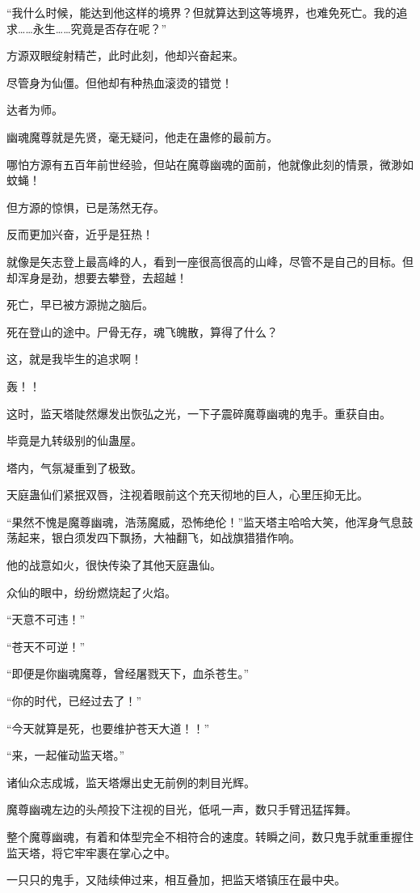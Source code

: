 \begin{this_body}
“我什么时候，能达到他这样的境界？但就算达到这等境界，也难免死亡。我的追求……永生……究竟是否存在呢？”

方源双眼绽射精芒，此时此刻，他却兴奋起来。

尽管身为仙僵。但他却有种热血滚烫的错觉！

达者为师。

幽魂魔尊就是先贤，毫无疑问，他走在蛊修的最前方。

哪怕方源有五百年前世经验，但站在魔尊幽魂的面前，他就像此刻的情景，微渺如蚊蝇！

但方源的惊惧，已是荡然无存。

反而更加兴奋，近乎是狂热！

就像是矢志登上最高峰的人，看到一座很高很高的山峰，尽管不是自己的目标。但却浑身是劲，想要去攀登，去超越！

死亡，早已被方源抛之脑后。

死在登山的途中。尸骨无存，魂飞魄散，算得了什么？

这，就是我毕生的追求啊！

轰！！

这时，监天塔陡然爆发出恢弘之光，一下子震碎魔尊幽魂的鬼手。重获自由。

毕竟是九转级别的仙蛊屋。

塔内，气氛凝重到了极致。

天庭蛊仙们紧抿双唇，注视着眼前这个充天彻地的巨人，心里压抑无比。

“果然不愧是魔尊幽魂，浩荡魔威，恐怖绝伦！”监天塔主哈哈大笑，他浑身气息鼓荡起来，银白须发四下飘扬，大袖翻飞，如战旗猎猎作响。

他的战意如火，很快传染了其他天庭蛊仙。

众仙的眼中，纷纷燃烧起了火焰。

“天意不可违！”

“苍天不可逆！”

“即便是你幽魂魔尊，曾经屠戮天下，血杀苍生。”

“你的时代，已经过去了！”

“今天就算是死，也要维护苍天大道！！”

“来，一起催动监天塔。”

诸仙众志成城，监天塔爆出史无前例的刺目光辉。

魔尊幽魂左边的头颅投下注视的目光，低吼一声，数只手臂迅猛挥舞。

整个魔尊幽魂，有着和体型完全不相符合的速度。转瞬之间，数只鬼手就重重握住监天塔，将它牢牢裹在掌心之中。

一只只的鬼手，又陆续伸过来，相互叠加，把监天塔镇压在最中央。


\end{this_body}
